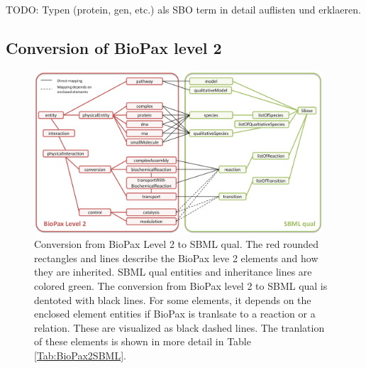 \documentclass{bioinfo}
\begin{document}
\begin{methods}
TODO: Typen (protein, gen, etc.) als SBO term in detail auflisten und erklaeren.


\subsection{Conversion of BioPax level 2}


\begin{figure}[t!h]
\centering \includegraphics[width=0.96\textwidth]{BioPax2SBMLqual.png}
\caption{Conversion from BioPax Level 2 to SBML qual. The red rounded rectangles and lines describe the BioPax leve 2 elements and how they are inherited. SBML qual entities and inheritance lines are colored green. The conversion from BioPax level 2 to SBML qual is dentoted with black lines. For some elements, it depends on the enclosed element entities if BioPax is tranlsate to a reaction or a relation. These are visualized as black dashed lines. The tranlation of these elements is shown in more detail in Table \ref{Tab:BioPax2SBML}.}\label{fig:BioPax2SBMLqual}
\end{figure}



\end{methods}
\end{document}
